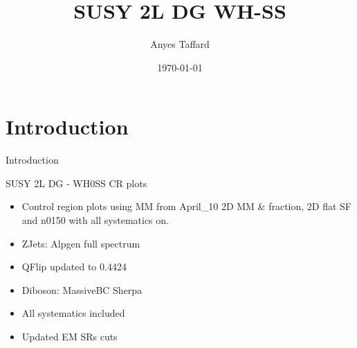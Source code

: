 \documentclass[10pt]{beamer}
\begin{document}

\newcommand{\METrel}{\ensuremath{E_\mathrm{T}^\mathrm{miss,rel}}}
\newcommand{\meff}{\ensuremath{m_{\mathrm{eff}}}}
\newcommand{\mt}{\ensuremath{m_\mathrm{T}}}
\newcommand{\pTmiss}{\ensuremath{\mathbf{p}_\mathrm{T}^\mathrm{miss}}}
\newcommand{\mll}{\ensuremath{m_{\ell\ell}}}
\newcommand{\pTll}{\ensuremath{p_\mathrm{T,\ell\ell}}}
\newcommand{\dphill}{\ensuremath{\Delta\phi_{\ell\ell}}}
\newcommand{\dRll}{\ensuremath{\Delta R_{\ell\ell}}}
\newcommand{\mjj}{\ensuremath{m_{jj}}}
\newcommand{\mljj}{\ensuremath{m_{ljj}}}


\author{Anyes Taffard}
\date{\today}

\title[SUSY 2L WH SS ]{SUSY 2L DG WH-SS}

\begin{frame}[plain]
  \titlepage
\end{frame}

\section{Introduction}
\begin{frame}{Introduction}
  \begin{block}{SUSY 2L DG - WH0SS CR plots }
    \begin{itemize}
    \item Control region plots using MM from April\_10 2D MM \& fraction, 2D flat SF and n0150 with all systematics on.
    \item ZJets: Alpgen full spectrum
    \item QFlip updated to 0.4424
    \item Diboson: MassiveBC Sherpa
    \item All systematics included
    \item Updated EM SRs cuts
    \end{itemize}
  \end{block}
\end{frame}
\end{document}
